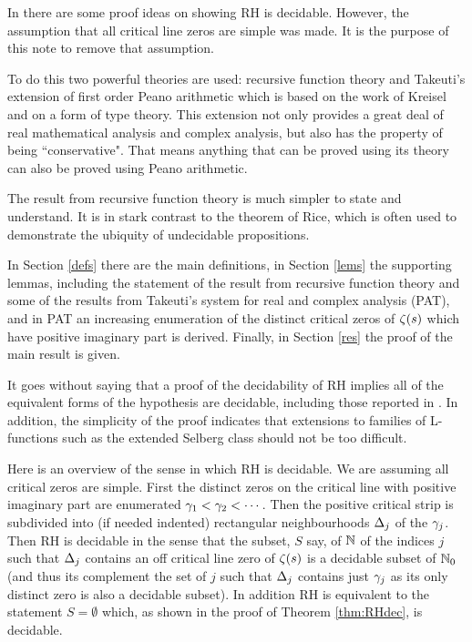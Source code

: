 \documentclass[12pt]{article}
\begin{document}
In \cite[Chapter 11]{bro} there are some proof ideas on showing RH is decidable. However, the assumption that all critical line zeros are simple was made. It is the purpose of this note to remove that assumption.\par

To do this two powerful theories are used: recursive function theory and Takeuti's extension of first order Peano arithmetic which is based on the work of Kreisel and on a form of type theory. This extension not only provides a great deal of real mathematical analysis and complex analysis, but also has the property of being ``conservative". That means
anything that can be proved using its theory can also be proved using Peano arithmetic.\par

The result from recursive function theory is much simpler to state and understand. It is in stark contrast to the theorem of Rice, which is often used to demonstrate the ubiquity of undecidable propositions.\par

In Section \ref{defs} there are the main definitions,
in Section \ref{lems} the supporting lemmas, including the statement of the result from recursive function theory and some of the results from Takeuti's system for real and complex analysis (PAT), and in PAT an increasing enumeration of the distinct critical zeros of $\zeta(s)$ which have positive imaginary part is derived. Finally, in Section \ref{res} the proof of the main result is given.\par

It goes without saying that a proof of the decidability of RH implies all of the equivalent forms of the hypothesis are decidable, including those reported in \cite{bro12, bro}. In addition, the simplicity of the proof indicates that extensions to families of L-functions such as the extended Selberg class should not be too difficult.\par

Here is an overview of the sense in which RH is decidable. We are assuming all critical zeros are simple. First the distinct zeros on the critical line with positive imaginary part are enumerated $\gamma_1<\gamma_2<\cdots$. Then the positive critical strip is subdivided into (if needed indented) rectangular neighbourhoods $\Delta_j$ of the $\gamma_j$. Then RH is decidable in the sense that the subset, $S$ say, of $\mathbb{N}$ of the indices $j$ such that $\Delta_j$ contains an off critical line zero of $\zeta(s)$ is a decidable subset of $\mathbb{N}_0$ (and thus its complement the set of $j$ such that $\Delta_j$ contains just $\gamma_j$ as its only distinct zero is also a decidable subset). In addition RH is equivalent to the statement $S=\emptyset$ which, as shown in the proof of Theorem \ref{thm:RHdec}, is decidable.\par
\end{document}
